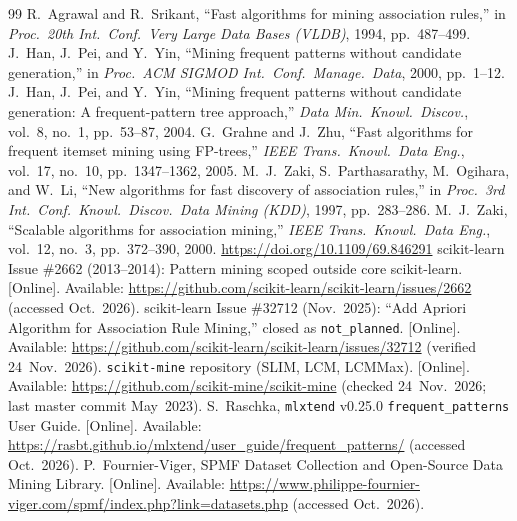 \clearpage
{}
\begingroup
\linespread{1.0}\fontsize{9.5}{11.5}\selectfont
\begin{thebibliography}{99}
 R.~Agrawal and R.~Srikant, ``Fast algorithms for mining association rules,'' in \emph{Proc.\ 20th Int.\ Conf.\ Very Large Data Bases (VLDB)}, 1994, pp.~487--499.
 J.~Han, J.~Pei, and Y.~Yin, ``Mining frequent patterns without candidate generation,'' in \emph{Proc.\ ACM SIGMOD Int.\ Conf.\ Manage.\ Data}, 2000, pp.~1--12.
 J.~Han, J.~Pei, and Y.~Yin, ``Mining frequent patterns without candidate generation: A frequent-pattern tree approach,'' \emph{Data Min.\ Knowl.\ Discov.}, vol.~8, no.~1, pp.~53--87, 2004.
 G.~Grahne and J.~Zhu, ``Fast algorithms for frequent itemset mining using FP-trees,'' \emph{IEEE Trans.\ Knowl.\ Data Eng.}, vol.~17, no.~10, pp.~1347--1362, 2005.
 M.~J.~Zaki, S.~Parthasarathy, M.~Ogihara, and W.~Li, ``New algorithms for fast discovery of association rules,'' in \emph{Proc.\ 3rd Int.\ Conf.\ Knowl.\ Discov.\ Data Mining (KDD)}, 1997, pp.~283--286.
 M.~J.~Zaki, ``Scalable algorithms for association mining,'' \emph{IEEE Trans.\ Knowl.\ Data Eng.}, vol.~12, no.~3, pp.~372--390, 2000. \url{https://doi.org/10.1109/69.846291}
 scikit-learn Issue \#2662 (2013--2014): Pattern mining scoped outside core scikit-learn. [Online]. Available: \url{https://github.com/scikit-learn/scikit-learn/issues/2662} (accessed Oct.~2026).
 scikit-learn Issue \#32712 (Nov.~2025): ``Add Apriori Algorithm for Association Rule Mining,'' closed as \texttt{not\_\protect\allowbreak{}planned}. [Online]. Available: \url{https://github.com/scikit-learn/scikit-learn/issues/32712} (verified 24~Nov.~2026).
 \texttt{scikit-mine} repository (SLIM, LCM, LCMMax). [Online]. Available: \url{https://github.com/scikit-mine/scikit-mine} (checked 24~Nov.~2026; last master commit May~2023).
 S.~Raschka, \texttt{mlxtend} v0.25.0 \texttt{frequent\_\protect\allowbreak{}patterns} User Guide. [Online]. Available: \url{https://rasbt.github.io/mlxtend/user_guide/frequent_patterns/} (accessed Oct.~2026).
 P.~Fournier-Viger, SPMF Dataset Collection and Open-Source Data Mining Library. [Online]. Available: \url{https://www.philippe-fournier-viger.com/spmf/index.php?link=datasets.php} (accessed Oct.~2026).

\end{thebibliography}
